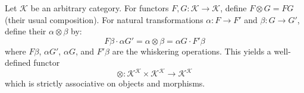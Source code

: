 Let $\mathcal{K}$ be an arbitrary category. For functors $F, G: \mathcal{K} \longrightarrow \mathcal{K}$, define $F \otimes G = FG$ (their usual composition). For natural transformations $\alpha: F \longrightarrow F'$ and $\beta: G \longrightarrow G'$, define their  $\alpha \otimes \beta$ by:
$$
F\beta \cdot \alpha G' = \alpha \otimes \beta = \alpha G \cdot F'\beta
$$
where $F\beta$, $\alpha G'$, $\alpha G$, and $F'\beta$ are the whiskering operations. This yields a well-defined functor
$$
\otimes: \mathcal{K}^\mathcal{K} \times \mathcal{K}^\mathcal{K} \longrightarrow \mathcal{K}^\mathcal{K}
$$
which is strictly associative on objects and morphisms.
